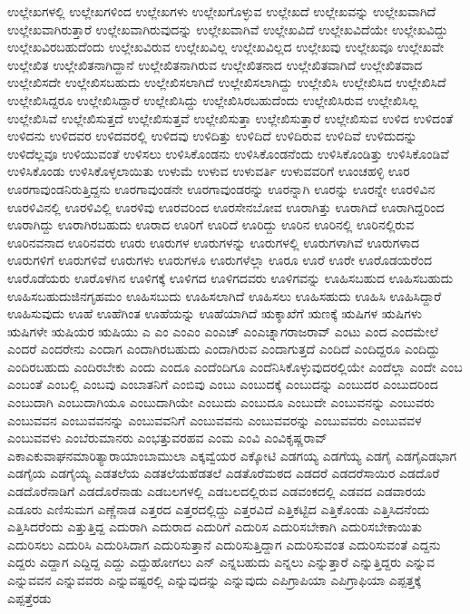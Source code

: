{ಉಲ್ಲೇಖಗಳಲ್ಲಿ
ಉಲ್ಲೇಖಗಳಿಂದ
ಉಲ್ಲೇಖಗಳು
ಉಲ್ಲೇಖಗೊಳ್ಳುವ
ಉಲ್ಲೇಖದೆ
ಉಲ್ಲೇಖವನ್ನು
ಉಲ್ಲೇಖವಾಗಿದೆ
ಉಲ್ಲೇಖವಾಗಿರುತ್ತಾರೆ
ಉಲ್ಲೇಖವಾಗಿರುವುದನ್ನು
ಉಲ್ಲೇಖವಾಗಿವೆ
ಉಲ್ಲೇಖವಿದೆ
ಉಲ್ಲೇಖವಿದೆಯೇ
ಉಲ್ಲೇಖವಿದ್ದು
ಉಲ್ಲೇಖವಿರಬಹುದೆಂದು
ಉಲ್ಲೇಖವಿರುವ
ಉಲ್ಲೇಖವಿಲ್ಲ
ಉಲ್ಲೇಖವಿಲ್ಲದ
ಉಲ್ಲೇಖವು
ಉಲ್ಲೇಖವೂ
ಉಲ್ಲೇಖವೇ
ಉಲ್ಲೇಖಿತ
ಉಲ್ಲೇಖಿತನಾಗಿದ್ದಾನೆ
ಉಲ್ಲೇಖಿತನಾಗಿರುವ
ಉಲ್ಲೇಖಿತನಾದ
ಉಲ್ಲೇಖಿತವಾಗಿದೆ
ಉಲ್ಲೇಖಿತವಾದ
ಉಲ್ಲೇಖಿಸದೇ
ಉಲ್ಲೇಖಿಸಬಹುದು
ಉಲ್ಲೇಖಿಸಲಾಗಿದೆ
ಉಲ್ಲೇಖಿಸಲಾಗಿದ್ದು
ಉಲ್ಲೇಖಿಸಿ
ಉಲ್ಲೇಖಿಸಿದ
ಉಲ್ಲೇಖಿಸಿದೆ
ಉಲ್ಲೇಖಿಸಿದ್ದರೂ
ಉಲ್ಲೇಖಿಸಿದ್ದಾರೆ
ಉಲ್ಲೇಖಿಸಿದ್ದು
ಉಲ್ಲೇಖಿಸಿರಬಹುದೆಂದು
ಉಲ್ಲೇಖಿಸಿರುವ
ಉಲ್ಲೇಖಿಸಿಲ್ಲ
ಉಲ್ಲೇಖಿಸಿವೆ
ಉಲ್ಲೇಖಿಸುತ್ತದೆ
ಉಲ್ಲೇಖಿಸುತ್ತವೆ
ಉಲ್ಲೇಖಿಸುತ್ತಾ
ಉಲ್ಲೇಖಿಸುತ್ತಾರೆ
ಉಲ್ಲೇಖಿಸುವ
ಉಳಿದ
ಉಳಿದಂತೆ
ಉಳಿದನು
ಉಳಿದವರ
ಉಳಿದವರಲ್ಲಿ
ಉಳಿದವು
ಉಳಿದಿತ್ತು
ಉಳಿದಿದೆ
ಉಳಿದಿರುವ
ಉಳಿದಿವೆ
ಉಳಿದುದನ್ನು
ಉಳಿದೆಲ್ಲವೂ
ಉಳಿಯುವಂತೆ
ಉಳಿಸಲು
ಉಳಿಸಿಕೊಂಡನು
ಉಳಿಸಿಕೊಂಡನೆಂದು
ಉಳಿಸಿಕೊಂಡಿತ್ತು
ಉಳಿಸಿಕೊಂಡಿವೆ
ಉಳಿಸಿಕೊಂಡು
ಉಳಿಸಿಕೊಳ್ಳಲಾಯಿತು
ಉಳುಮೆ
ಉಳುವ
ಉಳುವರ್ತಿ
ಉಳುವವರಿಗೆ
ಊಂಚಹಳ್ಳಿ
ಊರ
ಊರಗಾವುಂಡನಿರುತ್ತಿದ್ದನು
ಊರಗಾವುಂಡನೇ
ಊರಗಾವುಂಡರನ್ನು
ಊರನ್ನಾಗಿ
ಊರನ್ನು
ಊರನ್ನೇ
ಊರಳಿವಿನ
ಊರಳಿವಿನಲ್ಲಿ
ಊರಳಿವಿಲ್ಲಿ
ಊರಳಿವು
ಊರವರಿಂದ
ಊರಸೇನಬೋವ
ಊರಾಗಿತ್ತು
ಊರಾಗಿದೆ
ಊರಾಗಿದ್ದರಿಂದ
ಊರಾಗಿದ್ದು
ಊರಾಗಿರಬಹುದು
ಊರಾದ
ಊರಿಗೆ
ಊರಿದೆ
ಊರಿದ್ದು
ಊರಿನ
ಊರಿನಲ್ಲಿ
ಊರಿನಲ್ಲಿರುವ
ಊರಿನವನಾದ
ಊರಿನವರು
ಊರು
ಊರುಗಳ
ಊರುಗಳನ್ನು
ಊರುಗಳಲ್ಲಿ
ಊರುಗಳಾಗಿವೆ
ಊರುಗಳಾದ
ಊರುಗಳಿಗೆ
ಊರುಗಳಿವೆ
ಊರುಗಳು
ಊರುಗಳೂ
ಊರುಗಳೆಲ್ಲಾ
ಊರೂ
ಊರೆ
ಊರೇ
ಊರೊಡಯರೆಂದ
ಊರೊಡೆಯರು
ಊರೊಳಗಿನ
ಊಳಿಗಕ್ಕೆ
ಊಳಿಗದ
ಊಳಿಗದವರು
ಊಳಿಗವನ್ನು
ಊಹಿಸಬಹುದ
ಊಹಿಸಬಹುದು
ಊಹಿಸಬಹುದುಜಿನಗೃಹಮಂ
ಊಹಿಸಬುದು
ಊಹಿಸಲಾಗಿದೆ
ಊಹಿಸಲು
ಊಹಿಸಹುದು
ಊಹಿಸಿ
ಊಹಿಸಿದ್ದಾರೆ
ಊಹಿಸುವುದು
ಊಹೆ
ಊಹೆಗಿಂತ
ಊಹೆಯನ್ನು
ಊಹೆಯಾಗಿದೆ
ಋಕ್ಶಾಖೆಗೆ
ಋಣಕ್ಕೆ
ಋಷಿಗಳ
ಋಷಿಗಳು
ಋಷಿಗಳೇ
ಋಷಿಯರ
ಋಷಿಯು
ಎ
ಎಂ
ಎಂಎಂ
ಎಂಎಚ್
ಎಂಎಚ್ನಾಗರಾಜರಾವ್
ಎಂಟು
ಎಂದ
ಎಂದಮೇಲೆ
ಎಂದರೆ
ಎಂದರೇನು
ಎಂದಾಗ
ಎಂದಾಗಿರಬಹುದು
ಎಂದಾಗಿರುವ
ಎಂದಾಗುತ್ತದೆ
ಎಂದಿದೆ
ಎಂದಿದ್ದರೂ
ಎಂದಿದ್ದು
ಎಂದಿರಬಹುದು
ಎಂದಿರಬೇಕು
ಎಂದು
ಎಂದೂ
ಎಂದೆಂದಿಗೂ
ಎಂದೆನಿಸಿಕೊಳ್ಳುವುದರಲ್ಲಿಯೇ
ಎಂದೆಲ್ಲಾ
ಎಂದೇ
ಎಂಬ
ಎಂಬಂತೆ
ಎಂಬಲ್ಲಿ
ಎಂಬವು
ಎಂಬಾತನಿಗೆ
ಎಂಬಿವು
ಎಂಬು
ಎಂಬುದಕ್ಕೆ
ಎಂಬುದನ್ನು
ಎಂಬುದರ
ಎಂಬುದರಿಂದ
ಎಂಬುದಾಗಿ
ಎಂಬುದಾಗಿಯೂ
ಎಂಬುದಾಗಿಯೇ
ಎಂಬುದು
ಎಂಬುದೂ
ಎಂಬುದೇ
ಎಂಬುವನನ್ನು
ಎಂಬುವರು
ಎಂಬುವವನ
ಎಂಬುವವನನ್ನು
ಎಂಬುವವನಿಗೆ
ಎಂಬುವವನು
ಎಂಬುವವರನ್ನು
ಎಂಬುವವರು
ಎಂಬುವವಳ
ಎಂಬುವವಳು
ಎಂಬೆರುಮಾನರು
ಎಂಭತ್ತುವರಹವ
ಎಂಮ
ಎಂವಿ
ಎಂವಿಕೃಷ್ಣರಾವ್
ಎಕಾಎಕುವಾಘನಮಾರಿತ್ಯಾರಾಯಾಂಬಾಮುಲಾ
ಎಕ್ಕವ್ವೆಯರ
ಎಕ್ಕೋಟಿ
ಎಡಗಯ್ಯ
ಎಡಗೆಯ್ಯ
ಎಡಗೈ
ಎಡಗೈಎಡಭಾಗ
ಎಡಗೈಯ
ಎಡಗೈಯ್ಯ
ಎಡತಲೆಯ
ಎಡತಲೆಯಹೆಡತಲೆ
ಎಡತೊರೆಮಠದ
ಎಡದರೆ
ಎಡದರೆಸಾಯಿರ
ಎಡದೊರೆ
ಎಡದೊರೆನಾಡಿಗೆ
ಎಡದೊರೆನಾಡು
ಎಡಬಲಗಳಲ್ಲಿ
ಎಡಬಲದಲ್ಲಿರುವ
ಎಡವಂಕದಲ್ಲಿ
ಎಡವದ
ಎಡವಾರಯ
ಎಡೂರು
ಎಣಿಸುಮಗ
ಎಣ್ಣೆನಾಡ
ಎತ್ತರದ
ಎತ್ತರದಲ್ಲಿದ್ದು
ಎತ್ತರವಿದೆ
ಎತ್ತಿಕಟ್ಟಿದ
ಎತ್ತಿಕೊಂಡು
ಎತ್ತಿಸಿದನೆಂದು
ಎತ್ತಿಸಿದರೆಂದು
ಎತ್ತುತ್ತಿದ್ದ
ಎದುರಾಗಿ
ಎದುರಾದ
ಎದುರಿಗೆ
ಎದುರಿಸ
ಎದುರಿಸಬೇಕಾಗಿ
ಎದುರಿಸಬೇಕಾಯಿತು
ಎದುರಿಸಲು
ಎದುರಿಸಿ
ಎದುರಿಸಿದಾಗ
ಎದುರಿಸುತ್ತಾನೆ
ಎದುರಿಸುತ್ತಿದ್ದಾಗ
ಎದುರಿಸುವಂತ
ಎದುರಿಸುವಂತೆ
ಎದ್ದನು
ಎದ್ದರು
ಎದ್ದಾಗ
ಎದ್ದಿದ್ದ
ಎದ್ದು
ಎದ್ದುಹೋಗಲು
ಎನ್
ಎನ್ನಬಹುದು
ಎನ್ನಲು
ಎನ್ನುತ್ತಾರೆ
ಎನ್ನುತ್ತಿದ್ದರು
ಎನ್ನುವ
ಎನ್ನುವವನ
ಎನ್ನುವವರು
ಎನ್ನುವಷ್ಟರಲ್ಲಿ
ಎನ್ನುವುದನ್ನು
ಎನ್ನುವುದು
ಎಪಿಗ್ರಾಪಿಯಾ
ಎಪಿಗ್ರಾಫಿಯಾ
ಎಪ್ಪತ್ತಕ್ಕೆ
ಎಪ್ಪತ್ತೆರಡು
}
